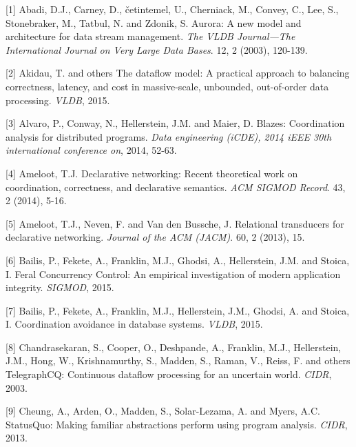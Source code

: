 \documentclass[b5paper,11pt,twoside,openright]{book}
\begin{document}
\leavevmode\hypertarget{ref-abadi2003aurora}{}%
{[}1{]} Abadi, D.J., Carney, D., četintemel, U., Cherniack, M., Convey,
C., Lee, S., Stonebraker, M., Tatbul, N. and Zdonik, S. Aurora: A new
model and architecture for data stream management. \emph{The VLDB
  Journal---The International Journal on Very Large Data Bases}. 12, 2
(2003), 120-139.

\leavevmode\hypertarget{ref-googledataflow}{}%
{[}2{]} Akidau, T. and others The dataflow model: A practical approach
to balancing correctness, latency, and cost in massive-scale, unbounded,
out-of-order data processing. \emph{VLDB}, 2015.

\leavevmode\hypertarget{ref-alvaro2014blazes}{}%
{[}3{]} Alvaro, P., Conway, N., Hellerstein, J.M. and Maier, D. Blazes:
Coordination analysis for distributed programs. \emph{Data engineering
  (iCDE), 2014 iEEE 30th international conference on}, 2014, 52-63.

\leavevmode\hypertarget{ref-ameloot2014declarative}{}%
{[}4{]} Ameloot, T.J. Declarative networking: Recent theoretical work on
coordination, correctness, and declarative semantics. \emph{ACM SIGMOD
  Record}. 43, 2 (2014), 5-16.

\leavevmode\hypertarget{ref-ameloot2013relational}{}%
{[}5{]} Ameloot, T.J., Neven, F. and Van den Bussche, J. Relational
transducers for declarative networking. \emph{Journal of the ACM
  (JACM)}. 60, 2 (2013), 15.

\leavevmode\hypertarget{ref-feral}{}%
{[}6{]} Bailis, P., Fekete, A., Franklin, M.J., Ghodsi, A., Hellerstein,
J.M. and Stoica, I. Feral Concurrency Control: An empirical
investigation of modern application integrity. \emph{SIGMOD}, 2015.

\leavevmode\hypertarget{ref-coord-avoid}{}%
{[}7{]} Bailis, P., Fekete, A., Franklin, M.J., Hellerstein, J.M.,
Ghodsi, A. and Stoica, I. Coordination avoidance in database systems.
\emph{VLDB}, 2015.

\leavevmode\hypertarget{ref-chandrasekarantelegraphcq}{}%
{[}8{]} Chandrasekaran, S., Cooper, O., Deshpande, A., Franklin, M.J.,
Hellerstein, J.M., Hong, W., Krishnamurthy, S., Madden, S., Raman, V.,
Reiss, F. and others TelegraphCQ: Continuous dataflow processing for an
uncertain world. \emph{CIDR}, 2003.

\leavevmode\hypertarget{ref-statusquo}{}%
{[}9{]} Cheung, A., Arden, O., Madden, S., Solar-Lezama, A. and Myers,
A.C. StatusQuo: Making familiar abstractions perform using program
analysis. \emph{CIDR}, 2013.
\end{document}
